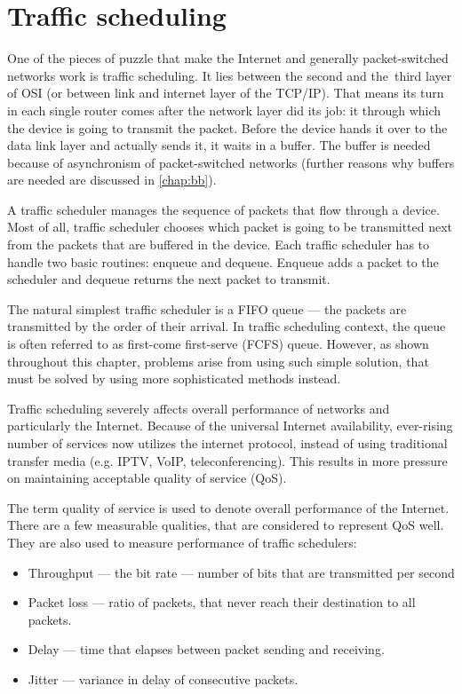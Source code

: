 \chapter{Traffic scheduling}
\label{chap:gf}
One of the pieces of puzzle that make the Internet and generally packet-switched networks work is traffic scheduling. It lies between the second and the~third layer of OSI (or between link and internet layer of the TCP/IP). That means its turn in each single router comes after the network layer did its job: it  through which the device is going to transmit the packet. Before the device hands it over to the data link layer and actually sends it, it waits in a buffer. The buffer is needed because of asynchronism of packet-switched networks (further reasons why buffers are needed are discussed in \autoref{chap:bb}).

A traffic scheduler manages the sequence of packets that flow through a device. Most of all, traffic scheduler chooses which packet is going to be transmitted next from the packets that are buffered in the device. Each traffic scheduler has to handle two basic routines: enqueue and dequeue. Enqueue adds a packet to the scheduler and dequeue returns the next packet to transmit.

The natural simplest traffic scheduler is a FIFO queue --- the packets are transmitted by the order of their arrival. In traffic scheduling context, the queue is often referred to as first-come first-serve (FCFS) queue. However, as shown throughout this chapter, problems arise from using such simple solution, that must be solved by using more sophisticated methods instead.

Traffic scheduling severely affects overall performance of networks and particularly the Internet. Because of the universal Internet availability, ever-rising number of services now utilizes the internet protocol, instead of using traditional transfer media (e.g. IPTV, VoIP, teleconferencing). This results in more pressure on maintaining acceptable quality of service (QoS).

The term quality of service is used to denote overall performance of the Internet. There are a few measurable qualities, that are considered to represent QoS well. They are also used to measure performance of traffic schedulers:
\begin{itemize}
	\item Throughput --- the bit rate --- number of bits that are transmitted per second
	\item Packet loss --- ratio of packets, that never reach their destination to all packets.
	\item Delay --- time that elapses between packet sending and receiving.
	\item Jitter --- variance in delay of consecutive packets.
\end{itemize}

